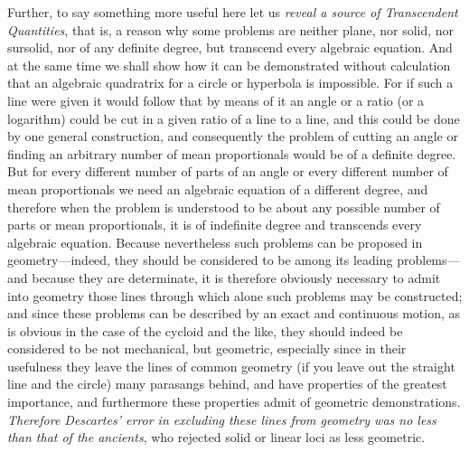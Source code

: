 \documentclass[twoside,openright]{article}
\begin{document}
Further, to say something more useful here let us {\em reveal a source
  of Transcendent Quantities}, that is, a reason why some problems are
neither plane, nor solid, nor sursolid, nor of any definite degree,
but transcend every algebraic equation.  And at the same time we shall
show how it can be demonstrated without calculation that an algebraic
quadratrix for a circle or hyperbola is impossible.\label{logtrans}
For if such a line were given it would follow that by means of it an
angle or a ratio (or a logarithm) could be cut in a given ratio of a
line to a line, and this could be done by one general construction,
and consequently the problem of cutting an angle or finding an
arbitrary number of mean proportionals would be of a definite degree.
But for every different number of parts of an angle or every different
number of mean proportionals we need an algebraic equation of a
different degree, and therefore when the problem is understood to be
about any possible number of parts or mean proportionals, it is of
indefinite degree and transcends every algebraic equation.  Because
nevertheless such problems can be proposed in geometry---indeed,
they should be considered to be among its leading problems---and
because they are determinate, it is therefore obviously necessary to
admit into geometry those lines through which alone such problems may
be constructed; and since these problems can be described by an exact
and continuous motion, as is obvious in the case of the cycloid and
the like, they should indeed be
considered to be not mechanical, but geometric, especially since in
their usefulness they leave the lines of common geometry (if you leave
out the straight line and the circle) many parasangs behind, and have
properties of the greatest importance, and furthermore these
properties admit of geometric demonstrations.  {\em Therefore
  Descartes' error in excluding these lines from geometry was no less
  than that of the ancients}, who rejected solid or linear loci as
less geometric.
\end{document}
